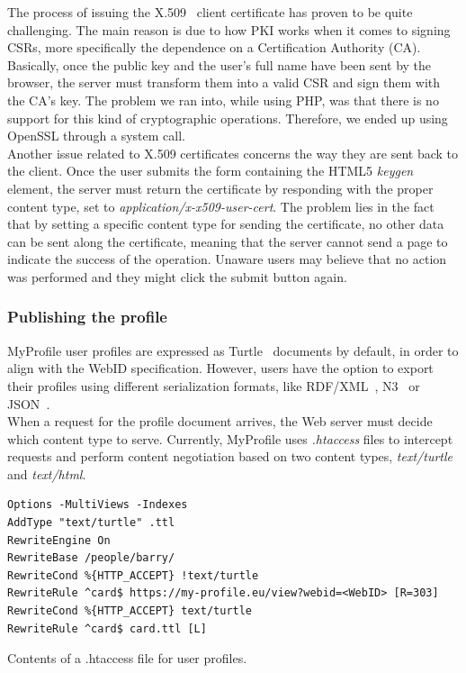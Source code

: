 The process of issuing the X.509~\cite{solo1999internet} client certificate has proven to be quite challenging. The main reason is due to how PKI works when it comes to signing CSRs, more specifically the dependence on a Certification Authority (CA). Basically, once the public key and the user's full name have been sent by the browser, the server must transform them into a valid CSR and sign them with the CA's key. The problem we ran into, while using PHP, was that there is no support for this kind of cryptographic operations. Therefore, we ended up using OpenSSL through a system call.\\

Another issue related to X.509 certificates concerns the way they are sent back to the client. Once the user submits the form containing the HTML5 \textit{keygen} element, the server must return the certificate by responding with the proper content type, set to \textit{application/x-x509-user-cert}. The problem lies in the fact that by setting a specific content type for sending the certificate, no other data can be sent along the certificate, meaning that the server cannot send a page to indicate the success of the operation. Unaware users may believe that no action was performed and they might click the submit button again.

\subsubsection{Publishing the profile}
MyProfile user profiles are expressed as Turtle~\cite{beckett2008turtle} documents by default, in order to align with the WebID specification. However, users have the option to export their profiles using different serialization formats, like RDF/XML~\cite{beckett2004rdf}, N3~\cite{berners2000primer} or JSON~\cite{crockford2006application}.\\

When a request for the profile document arrives, the Web server must decide which content type to serve. Currently, MyProfile uses \textit{.htaccess} files to intercept requests and perform content negotiation based on two content types, \textit{text/turtle} and \textit{text/html}.\\

\begin{example}[h]
\begin{verbatim}
Options -MultiViews -Indexes
AddType "text/turtle" .ttl
RewriteEngine On
RewriteBase /people/barry/
RewriteCond %{HTTP_ACCEPT} !text/turtle
RewriteRule ^card$ https://my-profile.eu/view?webid=<WebID> [R=303]
RewriteCond %{HTTP_ACCEPT} text/turtle
RewriteRule ^card$ card.ttl [L]
\end{verbatim}
\caption{Contents of a .htaccess file for user profiles.}
\label{ex:htaccess}
\end{example}

